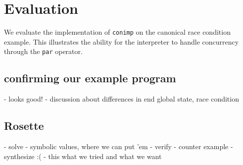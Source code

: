 \section{Evaluation}

We evaluate the implementation of \texttt{conimp} on the canonical race condition example. This illustrates the ability for the interpreter to handle concurrency through the \texttt{par} operator. 

\subsection{confirming our example program}
- looks good!
- discussion about differences in end global state, race condition

\subsection{Rosette}
- solve
	- symbolic values, where we can put 'em 
- verify
	- counter example
- synthesize :( 
	- this what we tried and what we want

